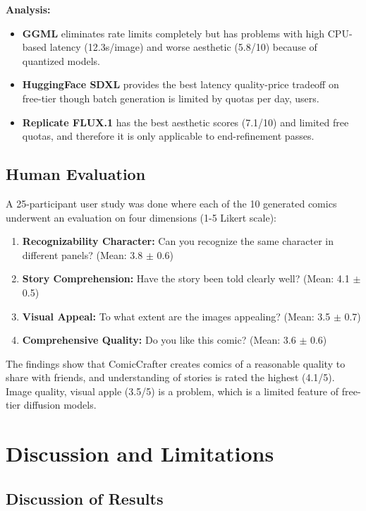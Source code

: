 \documentclass[runningheads]{llncs}
\begin{document}
\textbf{Analysis:}
\begin{itemize}
\item \textbf{GGML} eliminates rate limits completely but has problems with high CPU-based latency (12.3s/image) and worse aesthetic (5.8/10) because of quantized models.
\item \textbf{HuggingFace SDXL} provides the best latency quality-price tradeoff on free-tier though batch generation is limited by quotas per day, users.
\item \textbf{Replicate FLUX.1} has the best aesthetic scores (7.1/10) and limited free quotas, and therefore it is only applicable to end-refinement passes.
\end{itemize}

\subsection{Human Evaluation}

A 25-participant user study was done where each of the 10 generated comics underwent an evaluation on four dimensions (1-5 Likert scale):
\begin{enumerate}
\item \textbf{Recognizability Character:} Can you recognize the same character in different panels? (Mean: 3.8 $\pm$ 0.6)
\item \textbf{Story Comprehension:} Have the story been told clearly well? (Mean: 4.1 $\pm$ 0.5)
\item \textbf{Visual Appeal:} To what extent are the images appealing? (Mean: 3.5 $\pm$ 0.7)
\item \textbf{Comprehensive Quality:} Do you like this comic? (Mean: 3.6 $\pm$ 0.6)
\end{enumerate}

The findings show that ComicCrafter creates comics of a reasonable quality to share with friends, and understanding of stories is rated the highest (4.1/5). Image quality, visual apple (3.5/5) is a problem, which is a limited feature of free-tier diffusion models.

\section{Discussion and Limitations}
\label{sec:discussion}

\subsection{Discussion of Results}
\end{document}
